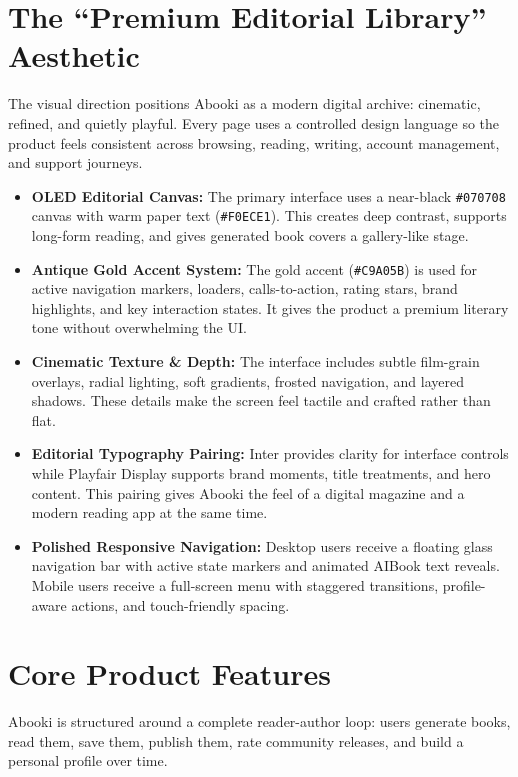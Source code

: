\documentclass[11pt, a4paper]{article}
\begin{document}
\section{The ``Premium Editorial Library'' Aesthetic}
The visual direction positions Abooki as a modern digital archive: cinematic, refined, and quietly playful. Every page uses a controlled design language so the product feels consistent across browsing, reading, writing, account management, and support journeys.

\begin{itemize}[label=\textcolor{abookigold}{\textbullet}]
    \item \textbf{OLED Editorial Canvas:} The primary interface uses a near-black \texttt{\#070708} canvas with warm paper text (\texttt{\#F0ECE1}). This creates deep contrast, supports long-form reading, and gives generated book covers a gallery-like stage.
    \item \textbf{Antique Gold Accent System:} The gold accent (\texttt{\#C9A05B}) is used for active navigation markers, loaders, calls-to-action, rating stars, brand highlights, and key interaction states. It gives the product a premium literary tone without overwhelming the UI.
    \item \textbf{Cinematic Texture \& Depth:} The interface includes subtle film-grain overlays, radial lighting, soft gradients, frosted navigation, and layered shadows. These details make the screen feel tactile and crafted rather than flat.
    \item \textbf{Editorial Typography Pairing:} Inter provides clarity for interface controls while Playfair Display supports brand moments, title treatments, and hero content. This pairing gives Abooki the feel of a digital magazine and a modern reading app at the same time.
    \item \textbf{Polished Responsive Navigation:} Desktop users receive a floating glass navigation bar with active state markers and animated AIBook text reveals. Mobile users receive a full-screen menu with staggered transitions, profile-aware actions, and touch-friendly spacing.
\end{itemize}

\section{Core Product Features}
Abooki is structured around a complete reader-author loop: users generate books, read them, save them, publish them, rate community releases, and build a personal profile over time.
\end{document}

